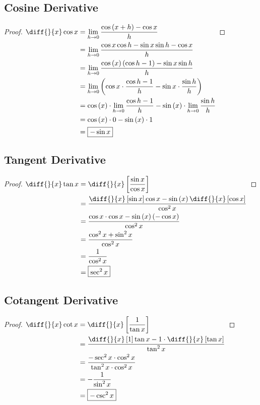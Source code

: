\documentclass{article}
\begin{document}
\subsection{Cosine Derivative}
\label{proof:cosderivative}
\begin{proof}
	$\begin{aligned}[t]
		\diff{}{x}\cos x&=\lim_{h\to0}
			\frac{\cos\left(x+h\right)-\cos x}{h} \\
		&=\lim_{h\to0}\frac{\cos x\cos h-\sin x\sin h-\cos x}{h} \\
		&=\lim_{h\to0}\frac{\cos\left(x\right)\left(\cos h-1\right)-
			\sin x\sin h}{h} \\
		&=\lim_{h\to0}\left(\cos x\cdot\frac{\cos h-1}{h}-
			\sin x\cdot\frac{\sin h}{h}\right) \\
		&=\cos\left(x\right)\cdot\lim_{h\to0}\frac{\cos h-1}
			{h}-\sin\left(x\right)\cdot\lim_{h\to0}\frac{\sin h}{h} \\
		&=\cos\left(x\right)\cdot0-\sin\left(x\right)\cdot1 \\
		&=\boxed{-\sin x}
	\end{aligned} \\$
\end{proof}

\subsection{Tangent Derivative}
\label{proof:tanderivative}
\begin{proof}
	$\begin{aligned}[t]
		\diff{}{x}\tan x&=\diff{}{x}\left[\frac{\sin x}{\cos x}\right] \\
		&=\frac{\diff{}{x}\left[\sin x\right]\cos x-\sin\left(x\right)
			\diff{}{x}\left[\cos x\right]}{\cos^2x} \\
		&=\frac{\cos x\cdot\cos x-\sin\left(x\right)\left(-\cos x\right)}
			{\cos^2x} \\
		&=\frac{\cos^2x+\sin^2x}{\cos^2x} \\
		&=\frac{1}{\cos^2x} \\
		&=\boxed{\sec^2x} \\
	\end{aligned} \\$
\end{proof}

\subsection{Cotangent Derivative}
\label{proof:cotderivative}
\begin{proof}
	$\begin{aligned}[t]
		\diff{}{x}\cot x&=\diff{}{x}\left[\frac{1}{\tan x}\right] \\
		&=\frac{\diff{}{x}\left[1\right]\tan x-1\cdot\diff{}{x}
			\left[\tan x\right]}{\tan^2x} \\
		&=\frac{-\sec^2x\cdot\cos^2x}{\tan^2x\cdot\cos^2x} \\
		&=-\frac{1}{\sin^2x} \\
		&=\boxed{-\csc^2x}
	\end{aligned} \\$
\end{proof}
\end{document}
